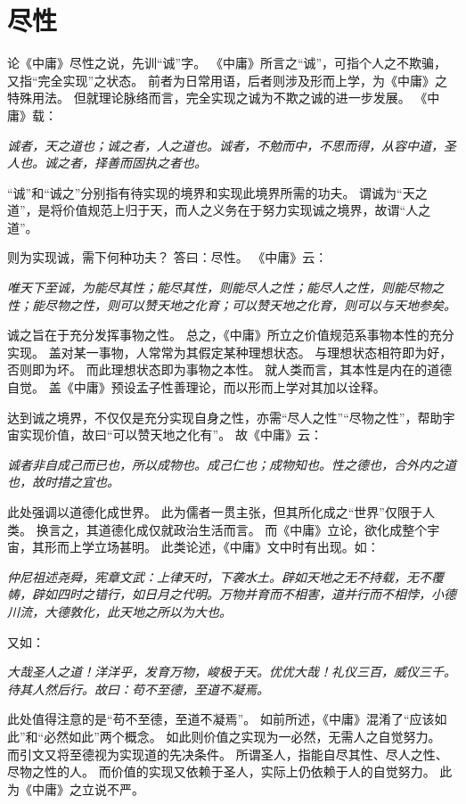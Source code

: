 \documentclass[11pt]{article}
\begin{document}
\section{尽性}
论《中庸》尽性之说，先训“诚”字。
《中庸》所言之“诚”，可指个人之不欺骗，又指“完全实现”之状态。
前者为日常用语，后者则涉及形而上学，为《中庸》之特殊用法。
但就理论脉络而言，完全实现之诚为不欺之诚的进一步发展。
《中庸》载：

\textit{诚者，天之道也；诚之者，人之道也。诚者，不勉而中，不思而得，从容中道，圣人也。诚之者，择善而固执之者也。}

“诚”和“诚之”分别指有待实现的境界和实现此境界所需的功夫。
谓诚为“天之道”，是将价值规范上归于天，而人之义务在于努力实现诚之境界，故谓“人之道”。

\newline

则为实现诚，需下何种功夫？
答曰：尽性。
《中庸》云：

\textit{唯天下至诚，为能尽其性；能尽其性，则能尽人之性；能尽人之性，则能尽物之性；能尽物之性，则可以赞天地之化育；可以赞天地之化育，则可以与天地参矣。}

诚之旨在于充分发挥事物之性。
总之，《中庸》所立之价值规范系事物本性的充分实现。
盖对某一事物，人常常为其假定某种理想状态。
与理想状态相符即为好，否则即为坏。
而此理想状态即为事物之本性。
就人类而言，其本性是内在的道德自觉。
盖《中庸》预设孟子性善理论，而以形而上学对其加以诠释。

\newline

达到诚之境界，不仅仅是充分实现自身之性，亦需“尽人之性”“尽物之性”，帮助宇宙实现价值，故曰“可以赞天地之化有”。
故《中庸》云：

\textit{诚者非自成己而已也，所以成物也。成己仁也；成物知也。性之德也，合外内之道也，故时措之宜也。}

此处强调以道德化成世界。
此为儒者一贯主张，但其所化成之“世界”仅限于人类。
换言之，其道德化成仅就政治生活而言。
而《中庸》立论，欲化成整个宇宙，其形而上学立场甚明。
此类论述，《中庸》文中时有出现。如：

\textit{仲尼祖述尧舜，宪章文武：上律天时，下袭水土。辟如天地之无不持载，无不覆帱，辟如四时之错行，如日月之代明。万物并育而不相害，道并行而不相悖，小德川流，大德敦化，此天地之所以为大也。}

又如：

\textit{大哉圣人之道！洋洋乎，发育万物，峻极于天。优优大哉！礼仪三百，威仪三千。待其人然后行。故曰：苟不至德，至道不凝焉。}

此处值得注意的是“苟不至德，至道不凝焉”。
如前所述，《中庸》混淆了“应该如此”和“必然如此”两个概念。
如此则价值之实现为一必然，无需人之自觉努力。
而引文又将至德视为实现道的先决条件。
所谓圣人，指能自尽其性、尽人之性、尽物之性的人。
而价值的实现又依赖于圣人，实际上仍依赖于人的自觉努力。
此为《中庸》之立说不严。
  
\end{document}
